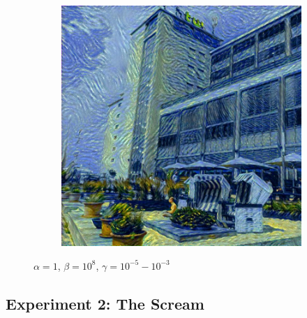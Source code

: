 \begin{figure}[H]
\begin{subfigure}[h]{0.3\textwidth}
    \end{subfigure}
    \begin{subfigure}[h]{0.3\textwidth}
        \centering
        \includegraphics[width=\textwidth]{resources/content/output/neural-style/htw-test-1-6.jpg}
    \end{subfigure}
    \caption{$ \alpha = 1 $, $ \beta = 10^{8} $, $ \gamma = 10^{-5} - 10^{-3} $}
\end{figure}

\subsection{Experiment 2: The Scream}

